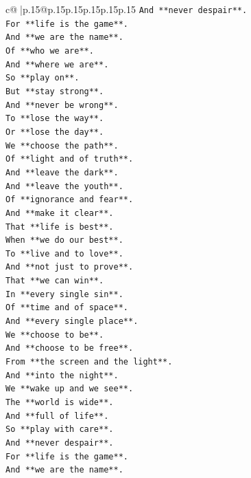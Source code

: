 \documentclass{article}
\begin{document}
{\begin{supertabular}{c@{$\;$}|p{.15\linewidth}@{}p{.15\linewidth}p{.15\linewidth}p{.15\linewidth}p{.15\linewidth}p{.15\linewidth}}
{{{\texttt{And **never despair**.} \\
\texttt{For **life is the game**.} \\
\texttt{And **we are the name**.} \\
\texttt{Of **who we are**.} \\
\texttt{And **where we are**.} \\
\texttt{So **play on**.} \\
\texttt{But **stay strong**.} \\
\texttt{And **never be wrong**.} \\
\texttt{To **lose the way**.} \\
\texttt{Or **lose the day**.} \\
\texttt{We **choose the path**.} \\
\texttt{Of **light and of truth**.} \\
\texttt{And **leave the dark**.} \\
\texttt{And **leave the youth**.} \\
\texttt{Of **ignorance and fear**.} \\
\texttt{And **make it clear**.} \\
\texttt{That **life is best**.} \\
\texttt{When **we do our best**.} \\
\texttt{To **live and to love**.} \\
\texttt{And **not just to prove**.} \\
\texttt{That **we can win**.} \\
\texttt{In **every single sin**.} \\
\texttt{Of **time and of space**.} \\
\texttt{And **every single place**.} \\
\texttt{We **choose to be**.} \\
\texttt{And **choose to be free**.} \\
\texttt{From **the screen and the light**.} \\
\texttt{And **into the night**.} \\
\texttt{We **wake up and we see**.} \\
\texttt{The **world is wide**.} \\
\texttt{And **full of life**.} \\
\texttt{So **play with care**.} \\
\texttt{And **never despair**.} \\
\texttt{For **life is the game**.} \\
\texttt{And **we are the name**.} \\
}}}
\end{supertabular}}
\end{document}
